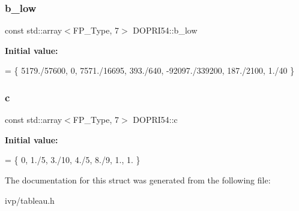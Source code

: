 \subsubsection{\texorpdfstring{b\+\_\+low}{b\_low}}
{\footnotesize\ttfamily const std\+::array$<$F\+P\+\_\+\+Type, 7$>$ D\+O\+P\+R\+I54\+::b\+\_\+low}

{\bfseries Initial value\+:}
\begin{DoxyCode}
= \{
    5179./57600, 0, 7571./16695, 393./640, -92097./339200, 187./2100, 1./40
  \}
\end{DoxyCode}
\mbox{\label{structDOPRI54_addfbe4836405ac9e827d2da960d9b589}} 
\subsubsection{\texorpdfstring{c}{c}}
{\footnotesize\ttfamily const std\+::array$<$F\+P\+\_\+\+Type, 7$>$ D\+O\+P\+R\+I54\+::c}

{\bfseries Initial value\+:}
\begin{DoxyCode}
= \{
    0, 1./5, 3./10, 4./5, 8./9, 1., 1.
  \}
\end{DoxyCode}


The documentation for this struct was generated from the following file\+:\begin{DoxyCompactItemize}
\item 
ivp/tableau.\+h\end{DoxyCompactItemize}
